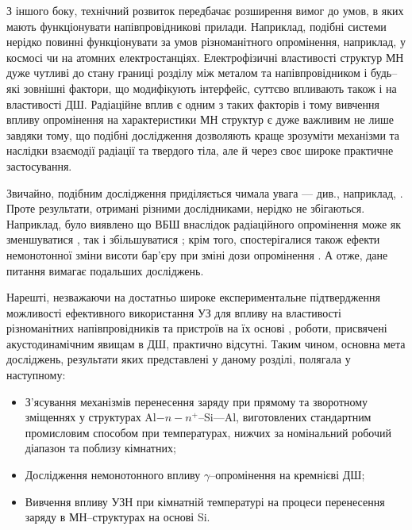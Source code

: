 З іншого боку, технічний розвиток передбачає розширення вимог до умов, в яких мають функціонувати напівпровідникові прилади.
Наприклад, подібні системи нерідко повинні функціонувати за умов різноманітного опромінення, наприклад, у космосі чи на атомних електростанціях.
Електрофізичні властивості структур МН дуже чутливі до стану границі розділу між металом та напівпровідником і будь--які
зовнішні фактори, що модифікують інтерфейс, суттєво впливають також і на властивості ДШ.
Радіаційне вплив є одним з таких факторів і тому вивчення впливу опромінення на характеристики МН структур є дуже важливим не лише завдяки
тому, що подібні дослідження дозволяють краще зрозуміти механізми та наслідки взаємодії радіації та твердого тіла,
але й через своє широке практичне застосування.



Звичайно, подібним дослідження приділяється чимала увага  --- див., наприклад,
\cite{Kumar1, Rao, Kumar2, Sharma, Ohyama, Tataroglu,Tascioglu2010old,Tataroglu:2007NIMA,Tataroglu3,Karatas:2006NIMA,Umana,Kinoshita,Vorobets,Pattabi,Kovalyuk,Verma,Abdolahpour}.
Проте результати, отримані різними дослідниками, нерідко не збігаються.
Наприклад, було виявлено що ВБШ внаслідок радіаційного опромінення може як зменшуватися \cite{Kumar1, Rao, Kumar2, Sharma, Ohyama,Tataroglu3},
так і збільшуватися \cite{Tataroglu,Tascioglu2010old,Tataroglu:2007NIMA};
крім того, спостерігалися також ефекти немонотонної зміни висоти бар'єру при зміні дози опромінення \cite{Karatas:2006NIMA,Umana,Kinoshita,Vorobets, Pattabi, Kovalyuk,Verma}.
А отже, дане питання вимагає подальших досліджень.

Нарешті, незважаючи на достатньо широке експериментальне підтвердження можливості ефективного використання УЗ для впливу на властивості різноманітних напівпровідників та
пристроїв на їх основі
\cite{Bahar2003,ZobovFTP2008,Parchinskii2006r,Roman:2007APL,Roman:2010JAP,Zaver2005,Davletova2008,Teterkin2009r,Tagaev,Pashaev2012r,YOlikhTPL2011r,Zaveryukhin2002:2},
роботи, присвячені акустодинамічним явищам в ДШ, практично відсутні.
Таким чином, основна мета досліджень, результати яких представлені у даному розділі, полягала у наступному:
\begin{itemize}[leftmargin=0cm,itemindent=1em]
  \item З'ясування механізмів перенесення заряду  при прямому та
    зворотному зміщеннях у структурах Al$-n-n^+$--Si---Al, виготовлених стандартним промисловим способом при температурах, нижчих за номінальний робочий діапазон та поблизу кімнатних;
  \item Дослідження немонотонного впливу $\gamma$--опромінення на кремнієві ДШ;
  \item Вивчення впливу УЗН при кімнатній температурі на процеси перенесення заряду в МН--структурах на основі Si.
\end{itemize}



